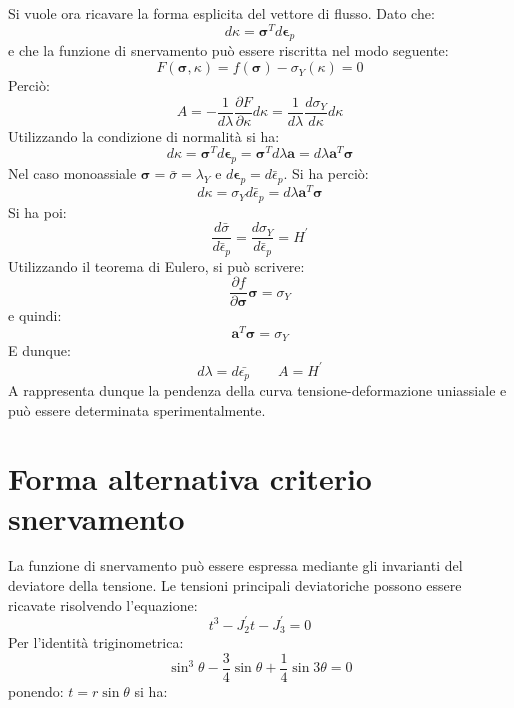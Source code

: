 Si vuole ora ricavare la forma esplicita del vettore di flusso. Dato che:
\begin{equation}
	d\kappa = \boldsymbol{\sigma} ^T d \boldsymbol{\epsilon}_p
\end{equation}
e che la funzione di snervamento può essere riscritta nel modo seguente:
\begin{equation}
	F(\boldsymbol{\sigma}, \kappa) = f(\boldsymbol{\sigma}) - \sigma_Y(\kappa) = 0
\end{equation}
Perciò:
\begin{equation}
	A = - \frac{1}{d \lambda} \frac{\partial F}{\partial \kappa} d \kappa = \frac{1}{d \lambda} \frac{d \sigma_Y}{d \kappa} d \kappa
\end{equation}
Utilizzando la condizione di normalità si ha:
\begin{equation}
	d \kappa = \boldsymbol{\sigma}^T d \boldsymbol{\epsilon}_p = \boldsymbol{\sigma}^T d \lambda \mathbf{a} = d \lambda \boldsymbol{a}^T \boldsymbol{\sigma}
\end{equation}
Nel caso monoassiale $\boldsymbol{\sigma}= \bar{\sigma}=\lambda_Y$ e $d \boldsymbol{\epsilon}_p = d \bar{\epsilon}_p$. Si ha perciò: 
\begin{equation}
	d \kappa = \sigma_Y d \bar{\epsilon}_p = d \lambda \boldsymbol{a}^T \boldsymbol{\sigma}
\end{equation}
Si ha poi:
\begin{equation}
	\frac{d \bar{\sigma}}{d \bar{\epsilon}_p} = \frac{d \sigma_Y}{d \bar{\epsilon}_p} = H^{'}
\end{equation}
Utilizzando il teorema di Eulero, si può scrivere:
\begin{equation}
	\frac{\partial f}{\partial \boldsymbol{\sigma}} \boldsymbol{\sigma} = \sigma_Y
\end{equation}
e quindi:
\begin{equation}
	\mathbf{a}^T \boldsymbol{\sigma} = \sigma_Y
\end{equation}
E dunque:
\begin{equation}
	d \lambda = d \bar{\epsilon_p} \qquad A = H^{'}
\end{equation}
A rappresenta dunque la pendenza della curva tensione-deformazione uniassiale e può essere determinata sperimentalmente.

\section{Forma alternativa criterio snervamento}
La funzione di snervamento può essere espressa mediante gli invarianti del deviatore della tensione. Le tensioni principali deviatoriche possono essere ricavate risolvendo l'equazione:
\begin{equation}
	t^3 - J_2^{'} t - J^{'}_3 = 0
\end{equation}
Per l'identità triginometrica:
\begin{equation}
		\sin^3 \theta - \frac{3}{4} \sin \theta + \frac{1}{4} \sin 3 \theta = 0
\end{equation}
ponendo: $t= r \sin \theta$ si ha:

